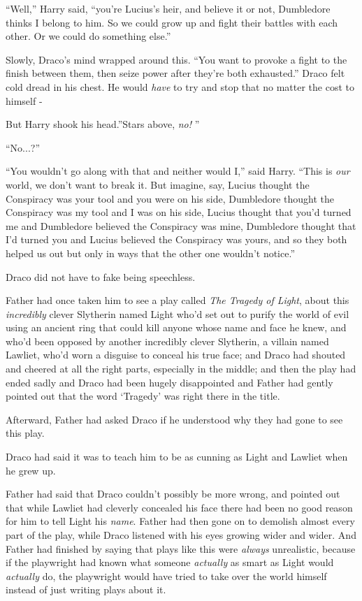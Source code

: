 ``Well,'' Harry said, ``you're Lucius's heir, and believe it or not,
Dumbledore thinks I belong to him. So we could grow up and fight their
battles with each other. Or we could do something else.''

Slowly, Draco's mind wrapped around this. ``You want to provoke a fight
to the finish between them, then seize power after they're both
exhausted.'' Draco felt cold dread in his chest. He would \emph{have} to
try and stop that no matter the cost to himself -

But Harry shook his head.''Stars above, \emph{no!} ''

``No...?''

``You wouldn't go along with that and neither would I,'' said Harry.
``This is \emph{our} world, we don't want to break it. But imagine, say,
Lucius thought the Conspiracy was your tool and you were on his side,
Dumbledore thought the Conspiracy was my tool and I was on his side,
Lucius thought that you'd turned me and Dumbledore believed the
Conspiracy was mine, Dumbledore thought that I'd turned you and Lucius
believed the Conspiracy was yours, and so they both helped us out but
only in ways that the other one wouldn't notice.''

Draco did not have to fake being speechless.

Father had once taken him to see a play called \emph{The Tragedy of
Light}, about this \emph{incredibly} clever Slytherin named Light who'd
set out to purify the world of evil using an ancient ring that could
kill anyone whose name and face he knew, and who'd been opposed by
another incredibly clever Slytherin, a villain named Lawliet, who'd worn
a disguise to conceal his true face; and Draco had shouted and cheered
at all the right parts, especially in the middle; and then the play had
ended sadly and Draco had been hugely disappointed and Father had gently
pointed out that the word `Tragedy' was right there in the title.

Afterward, Father had asked Draco if he understood why they had gone to
see this play.

Draco had said it was to teach him to be as cunning as Light and Lawliet
when he grew up.

Father had said that Draco couldn't possibly be more wrong, and pointed
out that while Lawliet had cleverly concealed his face there had been no
good reason for him to tell Light his \emph{name}. Father had then gone
on to demolish almost every part of the play, while Draco listened with
his eyes growing wider and wider. And Father had finished by saying that
plays like this were \emph{always} unrealistic, because if the
playwright had known what someone \emph{actually} as smart as Light
would \emph{actually} do, the playwright would have tried to take over
the world himself instead of just writing plays about it.

